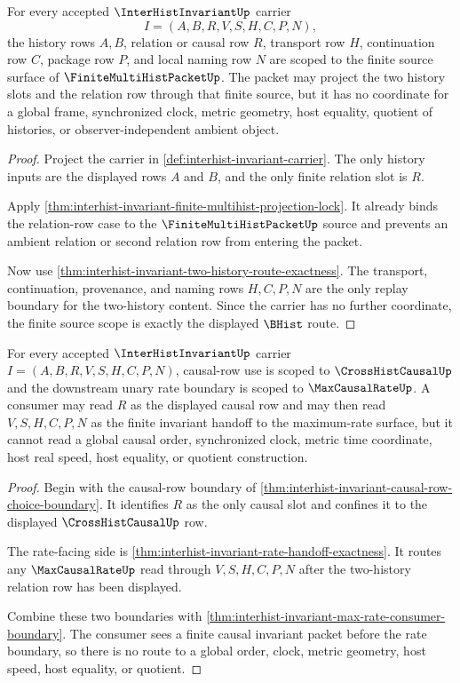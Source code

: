 \begin{theorem}
\label{thm:interhist-invariant-finite-source-scope}
For every accepted $\InterHistInvariantUp$ carrier
$$
I=(A,B,R,V,S,H,C,P,N),
$$
the history rows $A,B$, relation or causal row $R$, transport row $H$, continuation row $C$, package row $P$, and local naming row $N$ are scoped to the finite source surface of $\FiniteMultiHistPacketUp$. The packet may project the two history slots and the relation row through that finite source, but it has no coordinate for a global frame, synchronized clock, metric geometry, host equality, quotient of histories, or observer-independent ambient object.
\end{theorem}
\begin{proof}
Project the carrier in \autoref{def:interhist-invariant-carrier}. The only history inputs are the displayed rows $A$ and $B$, and the only finite relation slot is $R$.

Apply \autoref{thm:interhist-invariant-finite-multihist-projection-lock}. It already binds the relation-row case to the $\FiniteMultiHistPacketUp$ source and prevents an ambient relation or second relation row from entering the packet.

Now use \autoref{thm:interhist-invariant-two-history-route-exactness}. The transport, continuation, provenance, and naming rows $H,C,P,N$ are the only replay boundary for the two-history content. Since the carrier has no further coordinate, the finite source scope is exactly the displayed $\BHist$ route.
\end{proof}

\begin{theorem}
\label{thm:interhist-invariant-causal-rate-scope}
For every accepted $\InterHistInvariantUp$ carrier $I=(A,B,R,V,S,H,C,P,N)$, causal-row use is scoped to $\CrossHistCausalUp$ and the downstream unary rate boundary is scoped to $\MaxCausalRateUp$. A consumer may read $R$ as the displayed causal row and may then read $V,S,H,C,P,N$ as the finite invariant handoff to the maximum-rate surface, but it cannot read a global causal order, synchronized clock, metric time coordinate, host real speed, host equality, or quotient construction.
\end{theorem}
\begin{proof}
Begin with the causal-row boundary of \autoref{thm:interhist-invariant-causal-row-choice-boundary}. It identifies $R$ as the only causal slot and confines it to the displayed $\CrossHistCausalUp$ row.

The rate-facing side is \autoref{thm:interhist-invariant-rate-handoff-exactness}. It routes any $\MaxCausalRateUp$ read through $V,S,H,C,P,N$ after the two-history relation row has been displayed.

Combine these two boundaries with \autoref{thm:interhist-invariant-max-rate-consumer-boundary}. The consumer sees a finite causal invariant packet before the rate boundary, so there is no route to a global order, clock, metric geometry, host speed, host equality, or quotient.
\end{proof}

